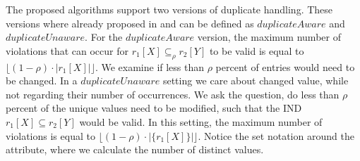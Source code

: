 \noindent The proposed algorithms support two versions of duplicate handling. These versions where already proposed in \cite{bauckTODO} and can be defined as $duplicateAware$ and $duplicateUnaware$. For the $duplicateAware$ version, the maximum number of violations that can occur for $r_1[X] \subseteq_{\rho} r_2[Y]$ to be valid is equal to $\lfloor (1-\rho) \cdot |r_1[X]| \rfloor$. We examine if less than $\rho$ percent of entries would need to be changed. In a $duplicateUnaware$ setting we care about changed value, while not regarding their number of occurrences. We ask the question, do less than $\rho$ percent of the unique values need to be modified, such that the IND $r_1[X] \subseteq r_2[Y]$ would be valid. In this setting, the maximum number of violations is equal to $\lfloor(1-\rho) \cdot |\{r_1[X]\}| \rfloor$. Notice the set notation around the attribute, where we calculate the number of distinct values. \\

